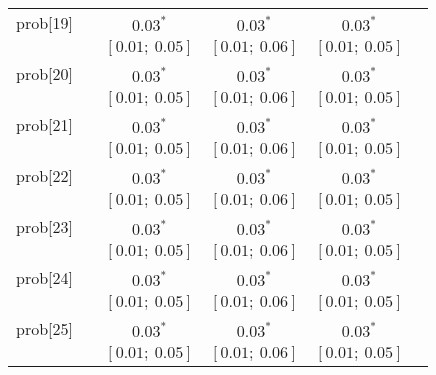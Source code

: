 \begin{table}
\begin{center}
\begin{tabular}{l c c c c c }
prob[19]    &                                  & $0.03^{*}$                & $0.03^{*}$                & $0.03^{*}$              &                         \\
            &                                  & $[0.01;\ 0.05]$           & $[0.01;\ 0.06]$           & $[0.01;\ 0.05]$         &                         \\
prob[20]    &                                  & $0.03^{*}$                & $0.03^{*}$                & $0.03^{*}$              &                         \\
            &                                  & $[0.01;\ 0.05]$           & $[0.01;\ 0.06]$           & $[0.01;\ 0.05]$         &                         \\
prob[21]    &                                  & $0.03^{*}$                & $0.03^{*}$                & $0.03^{*}$              &                         \\
            &                                  & $[0.01;\ 0.05]$           & $[0.01;\ 0.06]$           & $[0.01;\ 0.05]$         &                         \\
prob[22]    &                                  & $0.03^{*}$                & $0.03^{*}$                & $0.03^{*}$              &                         \\
            &                                  & $[0.01;\ 0.05]$           & $[0.01;\ 0.06]$           & $[0.01;\ 0.05]$         &                         \\
prob[23]    &                                  & $0.03^{*}$                & $0.03^{*}$                & $0.03^{*}$              &                         \\
            &                                  & $[0.01;\ 0.05]$           & $[0.01;\ 0.06]$           & $[0.01;\ 0.05]$         &                         \\
prob[24]    &                                  & $0.03^{*}$                & $0.03^{*}$                & $0.03^{*}$              &                         \\
            &                                  & $[0.01;\ 0.05]$           & $[0.01;\ 0.06]$           & $[0.01;\ 0.05]$         &                         \\
prob[25]    &                                  & $0.03^{*}$                & $0.03^{*}$                & $0.03^{*}$              &                         \\
            &                                  & $[0.01;\ 0.05]$           & $[0.01;\ 0.06]$           & $[0.01;\ 0.05]$         &                         \\

\end{tabular}
\end{center}
\end{table}
